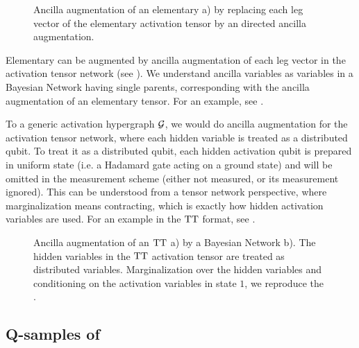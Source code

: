 \begin{figure}[t]
    \begin{center}
        
    \end{center}
    \caption{Ancilla augmentation of an elementary \ComputationActivationNetwork{} a) by replacing each leg vector of the elementary activation tensor by an directed ancilla augmentation.}
    \label{fig:canElementaryAugmentation}
\end{figure}

Elementary \ComputationActivationNetworks{} can be augmented by ancilla augmentation of each leg vector in the activation tensor network (see ).
We understand ancilla variables as variables in a Bayesian Network having single parents, corresponding with the ancilla augmentation of an elementary tensor.
For an example, see .

To a generic activation hypergraph $\mathcal{G}$, we would do ancilla augmentation for the activation tensor network, where each hidden variable is treated as a distributed qubit.
To treat it as a distributed qubit, each hidden activation qubit is prepared in uniform state (i.e. a Hadamard gate acting on a ground state) and will be omitted in the measurement scheme (either not measured, or its measurement ignored).
This can be understood from a tensor network perspective, where marginalization means contracting, which is exactly how hidden activation variables are used.
For an example in the $\mathrm{TT}$ format, see .

\begin{figure}[t]
    \begin{center}
        
    \end{center}
    \caption{Ancilla augmentation of an $\mathrm{TT}$ \ComputationActivationNetwork{} a) by a Bayesian Network b).
    The hidden variables in the $\mathrm{TT}$ activation tensor are treated as distributed variables.
    Marginalization over the hidden variables and conditioning on the activation variables in state $1$, we reproduce the \ComputationActivationNetwork{}.}
    \label{fig:canTTAugmentation}
\end{figure}

\subsection{Q-samples of \CompActNets{}}

